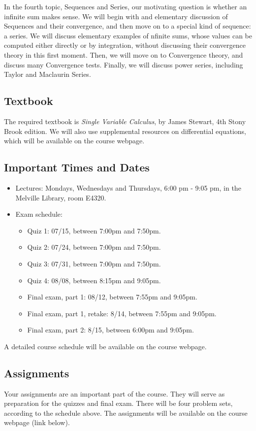 \documentclass[11pt]{amsart}
\numberwithin{equation}{section}
\begin{document}
In the fourth topic, Sequences and Series, our motivating question is whether an infinite sum makes sense. We will begin with and elementary discussion of Sequences and their convergence, and then move on to a special kind of sequence: a series. We will discuss elementary examples of nfinite sums, whose values can be computed either directly or by integration, without discussing their convergence theory in this first moment. Then, we will move on to Convergence theory, and discuss many Convergence tests. Finally, we will discuss power series, including Taylor and Maclaurin Series.

\subsection{Textbook}
The required textbook is \textit{Single Variable Calculus}, by James Stewart, 4th Stony Brook edition. We will also use supplemental resources on differential equations, which will be available on the course webpage.

\subsection{Important Times and Dates}
\begin{itemize}
\item Lectures: Mondays, Wednesdays and Thursdays, 6:00 pm - 9:05 pm, in the Melville Library, room E4320.
\item Exam schedule:
\begin{itemize}
\item Quiz 1: 07/15, between 7:00pm and 7:50pm.
\item Quiz 2: 07/24, between 7:00pm and 7:50pm.
\item Quiz 3: 07/31, between 7:00pm and 7:50pm.
\item Quiz 4: 08/08, between 8:15pm and 9:05pm.
\item Final exam, part 1: 08/12, between 7:55pm and 9:05pm.
\item Final exam, part 1, retake: 8/14, between 7:55pm and 9:05pm.
\item Final exam, part 2: 8/15, between 6:00pm and 9:05pm.
\end{itemize}
\end{itemize}

A detailed course schedule will be available on the course webpage. 

\subsection{Assignments}
Your assignments are an important part of the course. They will serve as preparation for the quizzes and final exam. There will be four problem sets, according to the schedule above. The assignments will be available on the course webpage (link below).
	
\end{document}
